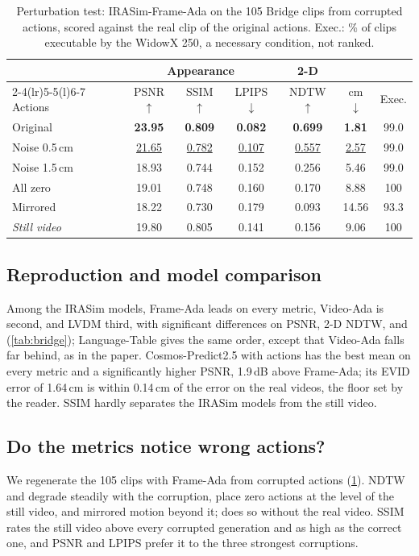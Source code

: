 \begin{table}[t]
  \centering
  \footnotesize
  \setlength{\tabcolsep}{3pt}
  \begin{tabular}{@{}lcccccc@{}}
    \toprule
    & \multicolumn{3}{c}{Appearance} & 2-D & \multicolumn{2}{c}{\ours{}} \\
    \cmidrule(lr){2-4}\cmidrule(lr){5-5}\cmidrule(l){6-7}
    Actions & PSNR$\uparrow$ & SSIM$\uparrow$ & LPIPS$\downarrow$ & NDTW$\uparrow$ & cm$\downarrow$ & Exec. \\
    \midrule
    Original & \textbf{23.95} & \textbf{0.809} & \textbf{0.082} & \textbf{0.699} & \textbf{1.81} & 99.0 \\
    Noise 0.5\,cm & \ul{21.65} & \ul{0.782} & \ul{0.107} & \ul{0.557} & \ul{2.57} & 99.0 \\
    Noise 1.5\,cm & 18.93 & 0.744 & 0.152 & 0.256 & 5.46 & 99.0 \\
    All zero & 19.01 & 0.748 & 0.160 & 0.170 & 8.88 & 100 \\
    Mirrored & 18.22 & 0.730 & 0.179 & 0.093 & 14.56 & 93.3 \\
    \textit{Still video} & 19.80 & 0.805 & 0.141 & 0.156 & 9.06 & 100 \\
    \bottomrule
  \end{tabular}
  \caption{Perturbation test: IRASim-Frame-Ada on the 105 Bridge clips from corrupted actions, scored against the real clip of the original actions. Exec.: \% of clips executable by the WidowX 250, a necessary condition, not ranked.}
  \label{tab:perturb}
\end{table}

\subsection{Reproduction and model comparison}
Among the IRASim models, Frame-Ada leads on every metric, Video-Ada is second, and LVDM third, with significant differences on PSNR, 2-D NDTW, and \ours{} (\cref{tab:bridge}); Language-Table gives the same order, except that Video-Ada falls far behind, as in the paper.
Cosmos-Predict2.5 with actions has the best mean on every metric and a significantly higher PSNR, 1.9\,dB above Frame-Ada; its EVID error of 1.64\,cm is within 0.14\,cm of the error on the real videos, the floor set by the reader.
SSIM hardly separates the IRASim models from the still video.

\subsection{Do the metrics notice wrong actions?}
We regenerate the 105 clips with Frame-Ada from corrupted actions (\cref{tab:perturb}).
NDTW and \ours{} degrade steadily with the corruption, place zero actions at the level of the still video, and mirrored motion beyond it; \ours{} does so without the real video.
SSIM rates the still video above every corrupted generation and as high as the correct one, and PSNR and LPIPS prefer it to the three strongest corruptions.

